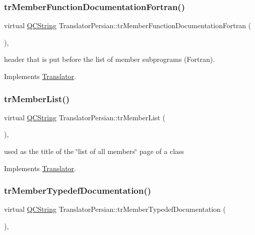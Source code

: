 \subsubsection{\texorpdfstring{trMemberFunctionDocumentationFortran()}{trMemberFunctionDocumentationFortran()}}
{\footnotesize\ttfamily virtual \mbox{\hyperlink{class_q_c_string}{Q\+C\+String}} Translator\+Persian\+::tr\+Member\+Function\+Documentation\+Fortran (\begin{DoxyParamCaption}{ }\end{DoxyParamCaption})\hspace{0.3cm}{\ttfamily [inline]}, {\ttfamily [virtual]}}

header that is put before the list of member subprograms (Fortran). 

Implements \mbox{\hyperlink{class_translator}{Translator}}.

\mbox{\label{class_translator_persian_a322f317eed71515472afb50d7d2a0892}} 
\subsubsection{\texorpdfstring{trMemberList()}{trMemberList()}}
{\footnotesize\ttfamily virtual \mbox{\hyperlink{class_q_c_string}{Q\+C\+String}} Translator\+Persian\+::tr\+Member\+List (\begin{DoxyParamCaption}{ }\end{DoxyParamCaption})\hspace{0.3cm}{\ttfamily [inline]}, {\ttfamily [virtual]}}

used as the title of the \char`\"{}list of all members\char`\"{} page of a class 

Implements \mbox{\hyperlink{class_translator}{Translator}}.

\mbox{\label{class_translator_persian_af887fdfd3839b41c2a906e60a0d308b0}} 
\subsubsection{\texorpdfstring{trMemberTypedefDocumentation()}{trMemberTypedefDocumentation()}}
{\footnotesize\ttfamily virtual \mbox{\hyperlink{class_q_c_string}{Q\+C\+String}} Translator\+Persian\+::tr\+Member\+Typedef\+Documentation (\begin{DoxyParamCaption}{ }\end{DoxyParamCaption})\hspace{0.3cm}{\ttfamily [inline]}, {\ttfamily [virtual]}}

